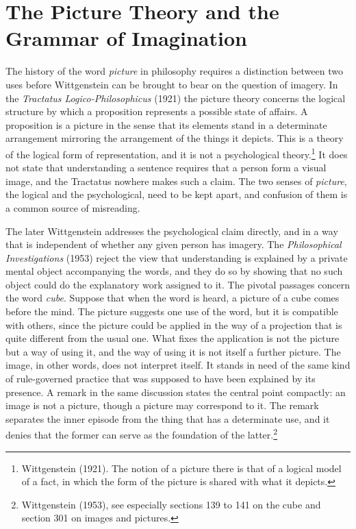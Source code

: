 \documentclass[11pt]{article}
\theoremstyle{remark}
\begin{document}
\section{The Picture Theory and the Grammar of Imagination}

The history of the word \emph{picture} in philosophy requires a distinction between two uses before Wittgenstein can be brought to bear on the question of imagery. In the \emph{Tractatus Logico-Philosophicus} (1921) the picture theory concerns the logical structure by which a proposition represents a possible state of affairs. A proposition is a picture in the sense that its elements stand in a determinate arrangement mirroring the arrangement of the things it depicts. This is a theory of the logical form of representation, and it is not a psychological theory.\footnote{Wittgenstein (1921). The notion of a picture there is that of a logical model of a fact, in which the form of the picture is shared with what it depicts.} It does not state that understanding a sentence requires that a person form a visual image, and the Tractatus nowhere makes such a claim. The two senses of \emph{picture}, the logical and the psychological, need to be kept apart, and confusion of them is a common source of misreading.

The later Wittgenstein addresses the psychological claim directly, and in a way that is independent of whether any given person has imagery. The \emph{Philosophical Investigations} (1953) reject the view that understanding is explained by a private mental object accompanying the words, and they do so by showing that no such object could do the explanatory work assigned to it. The pivotal passages concern the word \emph{cube}. Suppose that when the word is heard, a picture of a cube comes before the mind. The picture suggests one use of the word, but it is compatible with others, since the picture could be applied in the way of a projection that is quite different from the usual one. What fixes the application is not the picture but a way of using it, and the way of using it is not itself a further picture. The image, in other words, does not interpret itself. It stands in need of the same kind of rule-governed practice that was supposed to have been explained by its presence. A remark in the same discussion states the central point compactly: an image is not a picture, though a picture may correspond to it. The remark separates the inner episode from the thing that has a determinate use, and it denies that the former can serve as the foundation of the latter.\footnote{Wittgenstein (1953), see especially sections 139 to 141 on the cube and section 301 on images and pictures.}
\end{document}
